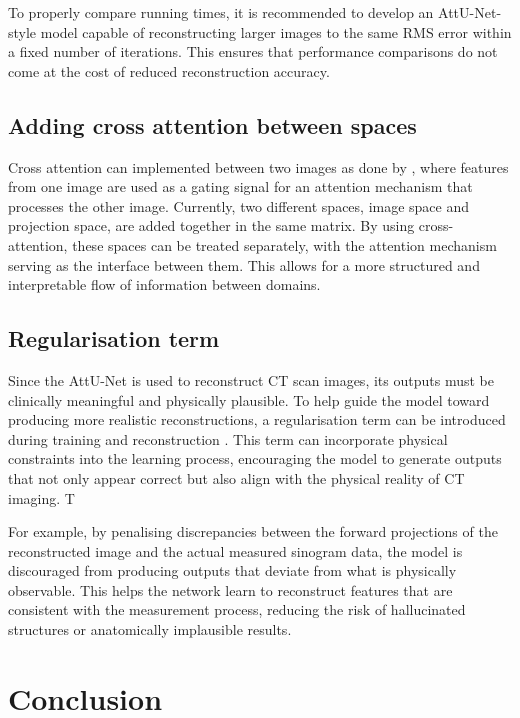 \documentclass{article}
\begin{document}
To properly compare running times, it is recommended to develop an AttU-Net-style model capable of reconstructing larger images to the same RMS error within a fixed number of iterations. This ensures that performance comparisons do not come at the cost of reduced reconstruction accuracy.

\subsection{Adding cross attention between spaces}

Cross attention can implemented between two images as done by \citep{alaluf2023cross}, where features from one image are used as a gating signal for an attention mechanism that processes the other image. Currently, two different spaces, image space and projection space, are added together in the same matrix. By using cross-attention, these spaces can be treated separately, with the attention mechanism serving as the interface between them. This allows for a more structured and interpretable flow of information between domains.

\subsection{Regularisation term}

Since the AttU-Net is used to reconstruct CT scan images, its outputs must be clinically meaningful and physically plausible. To help guide the model toward producing more realistic reconstructions, a regularisation term can be introduced during training and reconstruction \citep{ge2023mb}. This term can incorporate physical constraints into the learning process, encouraging the model to generate outputs that not only appear correct but also align with the physical reality of CT imaging. T

For example, by penalising discrepancies between the forward projections of the reconstructed image and the actual measured sinogram data, the model is discouraged from producing outputs that deviate from what is physically observable. This helps the network learn to reconstruct features that are consistent with the measurement process, reducing the risk of hallucinated structures or anatomically implausible results.

\section{Conclusion}
\end{document}
